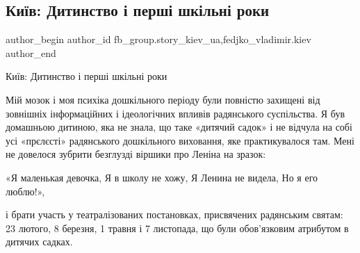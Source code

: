  
 
 
 
 
 
\subsection{Київ: Дитинство і перші шкільні роки}
\label{sec:19_12_2021.fb.fb_group.story_kiev_ua.1.detstvo_shkola}
 
\ifcmt
 author_begin
   author_id fb_group.story_kiev_ua,fedjko_vladimir.kiev
 author_end
\fi

Київ: Дитинство і перші шкільні роки 

Мій мозок і моя психіка дошкільного періоду були повністю захищені від
зовнішніх інформаційних і ідеологічних впливів радянського суспільства. Я був
домашньою дитиною, яка не знала, що таке «дитячий садок» і не відчула на собі
усі «прєлєсті» радянського дошкільного виховання, яке практикувалося там. Мені
не довелося зубрити безглузді віршики про Леніна на зразок:

\obeycr
«Я маленькая девочка,
Я в школу не хожу,
Я Ленина не видела,
Но я его люблю!»,
\restorecr

і брати участь у театралізованих постановках, присвячених радянським святам: 23
лютого, 8 березня, 1 травня і 7 листопада, що були обов’язковим атрибутом в
дитячих садках.

\begin{multicols}{2} %
\setlength{\parindent}{0pt}






\end{multicols} %

